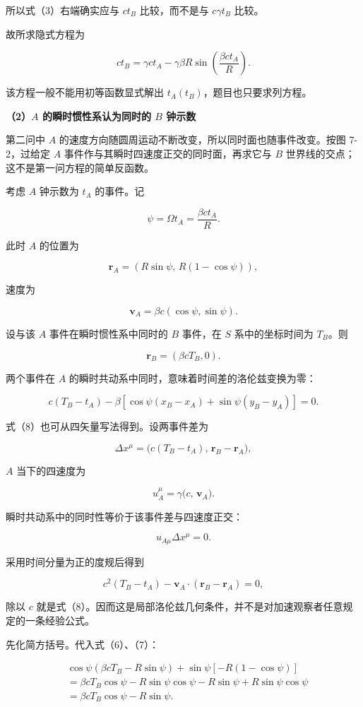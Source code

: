 \documentclass[12pt,a4paper,UTF8]{ctexart}
\begin{document}
所以式（3）右端确实应与 \(ct_B\) 比较，而不是与 \(c\gamma t_B\) 比较。

故所求隐式方程为

\[\boxed{
ct_B=\gamma ct_A-\gamma\beta R
\sin\left(\frac{\beta ct_A}{R}\right)
}. \tag{4}\]

该方程一般不能用初等函数显式解出 \(t_A(t_B)\)，题目也只要求列方程。

\textbf{（2）\(A\) 的瞬时惯性系认为同时的 \(B\) 钟示数}

第二问中 \(A\)
的速度方向随圆周运动不断改变，所以同时面也随事件改变。按图 7-2，过给定
\(A\) 事件作与其瞬时四速度正交的同时面，再求它与 \(B\)
世界线的交点；这不是第一问方程的简单反函数。

考虑 \(A\) 钟示数为 \(t_A\) 的事件。记

\[\psi=\Omega t_A=\frac{\beta ct_A}{R}. \tag{5}\]

此时 \(A\) 的位置为

\[\boldsymbol r_A=(R\sin\psi,\,R(1-\cos\psi)),\]

速度为

\[\boldsymbol v_A=\beta c(\cos\psi,\sin\psi). \tag{6}\]

设与该 \(A\) 事件在瞬时惯性系中同时的 \(B\) 事件，在 \(S\)
系中的坐标时间为 \(T_B\)。则

\[\boldsymbol r_B=(\beta cT_B,0). \tag{7}\]

两个事件在 \(A\) 的瞬时共动系中同时，意味着时间差的洛伦兹变换为零：

\[c(T_B-t_A)
-\beta\left[
\cos\psi(x_B-x_A)+\sin\psi(y_B-y_A)
\right]=0. \tag{8}\]

式（8）也可从四矢量写法得到。设两事件差为

\[\Delta x^\mu=\bigl(c(T_B-t_A),\,\boldsymbol r_B-\boldsymbol r_A\bigr),\]

\(A\) 当下的四速度为

\[u_A^\mu=\gamma\bigl(c,\,\boldsymbol v_A\bigr).\]

瞬时共动系中的同时性等价于该事件差与四速度正交：

\[u_{A\mu}\Delta x^\mu=0.\]

采用时间分量为正的度规后得到

\[c^2(T_B-t_A)-\boldsymbol v_A\cdot
(\boldsymbol r_B-\boldsymbol r_A)=0,\]

除以 \(c\)
就是式（8）。因而这是局部洛伦兹几何条件，并不是对加速观察者任意规定的一条经验公式。

先化简方括号。代入式（6）、（7）：

\[\begin{aligned}
&\cos\psi(\beta cT_B-R\sin\psi)
+\sin\psi[-R(1-\cos\psi)]\\
&=\beta cT_B\cos\psi
-R\sin\psi\cos\psi-R\sin\psi+R\sin\psi\cos\psi\\
&=\beta cT_B\cos\psi-R\sin\psi.
\end{aligned}\]
\end{document}
